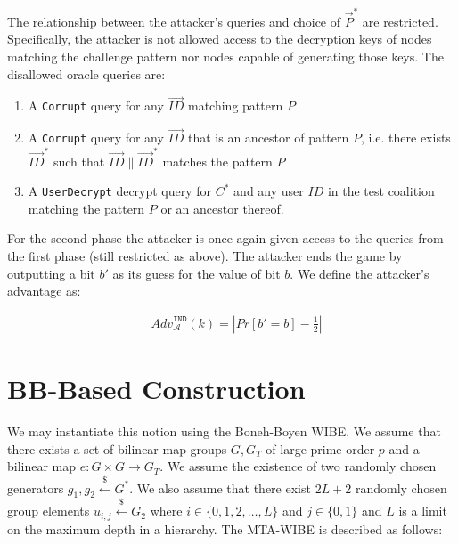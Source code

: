 \documentclass[10pt]{llncs}
\newcommand{\A}{\mathcal{A}}
\newcommand{\ID}{\mathit{ID}}
\newcommand{\getsr}{\stackrel{{\scriptscriptstyle\$}}{\gets}}
\newcommand{\adv}[2]{\mathit{Adv}_{#1}^{\texttt{#2}}}
\begin{document}
The relationship between the attacker's queries and choice of $\vec{P}^*$ are restricted. Specifically, the attacker is not allowed access to the decryption keys of nodes matching the challenge pattern nor nodes capable of generating those keys. The disallowed oracle queries are:
\begin{enumerate}
	\item A \texttt{Corrupt} query for any $\vec{\ID}$ matching pattern $\mathit{P}$
	\item A \texttt{Corrupt} query for any $\vec{\ID}$ that is an ancestor of pattern $\mathit{P}$, i.e. there exists $\vec{\ID}^*$ such that $\vec{\ID}\|\vec{\ID}^*$ matches the pattern $\mathit{P}$
	\item A \texttt{UserDecrypt} decrypt query for $C^{*}$ and any user $\ID$ in the test coalition matching the pattern $\mathit{P}$ or an ancestor thereof.
\end{enumerate}

For the second phase the attacker is once again given access to the queries from the first phase (still restricted as above). The attacker ends the game by outputting a bit $b'$ as its guess for the value of bit $b$. We define the attacker's advantage as:

\begin{eqnarray*}
	& \adv{\A}{IND}(k) = |Pr[b' = b] - \frac{1}{2}|
\end{eqnarray*}

\section{BB-Based Construction}

We may instantiate this notion using the Boneh-Boyen WIBE. We assume that there exists a set of bilinear map groups $G, G_{T}$ of large prime order $p$ and a bilinear map $e: G \times G \rightarrow G_{T}$. We assume the existence of two randomly chosen generators $g_{1},g_{2}\getsr G^{*}$. We also assume that there exist $2L+2$ randomly chosen group elements $u_{i,j} \getsr G_{2}$ where $i\in \{0,1,2,\ldots,L\}$ and $j\in \{0,1\}$ and $L$ is a limit on the maximum depth in a hierarchy. The MTA-WIBE is described as follows:
\end{document}
